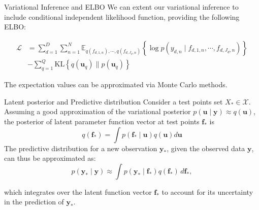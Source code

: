 \begin{frame}{Variational Inference and ELBO}
	We can extent our variational inference to include conditional independent likelihood function, providing the following ELBO:
	
\begin{equation*}
	\begin{split}
	\mathcal{L} &= \sum_{d=1}^D \sum_{n=1}^{N} \mathbb{E}_{q(f_{d,1,n}), \cdots, q(f_{d,J_d,n})} 
	\left\{ \log p\left( y_{d,n} \mid f_{d,1,n}, \cdots, f_{d,J_d,n} \right) \right\} \\
	&- \sum_{q=1}^Q \text{KL}\left\{ q(\mathbf{u}_q) \parallel p(\mathbf{u}_q) \right\}
	\end{split}
\end{equation*}

The expectation values can be approximated via Monte Carlo methods.
	
\end{frame}

\begin{frame}{Latent posterior and Predictive distribution}
	Consider a test points set $X_{*} \in \mathcal{X}$. Assuming a good approximation of the variational posterior $p(\mathbf{u} \mid \mathbf{y}) \approx q(\mathbf{u})$, the posterior of latent parameter function vector at test points $\mathbf{f}_*$ is
	\begin{equation*}
		q(\mathbf{f}_*) = \int p(\mathbf{f}_* \mid \mathbf{u}) q(\mathbf{u}) d\mathbf{u}
	\end{equation*}
	The predictive distribution for a new observation $\mathbf{y}_*$, given the observed data $\mathbf{y}$, can thus be approximated as:
	\begin{equation*}
		p(\mathbf{y}_* \mid \mathbf{y}) \approx \int p(\mathbf{y}_* \mid \mathbf{f}_*) q(\mathbf{f}_*) \, d\mathbf{f}_*,
	\end{equation*}
	
	which integrates over the latent function vector $\mathbf{f}_*$ to account for its uncertainty in the prediction of $\mathbf{y}_*$.

\end{frame}

